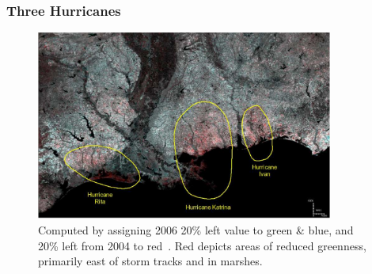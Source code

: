 \begin{frame}
 \frametitle{Three Hurricanes}
 \vskip-0.15in
 \begin{figure}
  \begin{center}
   \includegraphics[width=0.87\textwidth]{figures/MODIS3hurricanes3} \\
   \vbox{\small Computed by assigning 2006 20\% left value to green \& blue, and 20\% left from 2004 to red~\citep{Hargrove_PERS_20091001}. Red depicts areas of reduced greenness, primarily east of storm tracks and in marshes.}
  \end{center}
  \label{fig:MODIS3hurricanes3}
 \end{figure}
\end{frame}

